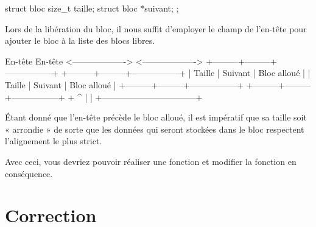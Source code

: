 \begin{C}
struct bloc
{
    size_t taille;
    struct bloc *suivant;
};
\end{C}

Lors de la libération du bloc, il nous suffit d'employer le champ
 de l'en-tête pour ajouter le bloc à la liste des blocs
libres.

\begin{C}
       En-tête                                          En-tête
<------------------->                            <------------------->
+---------+---------+-----------------+          +---------+---------+-----------------+
| Taille  | Suivant |   Bloc alloué   |          | Taille  | Suivant |   Bloc alloué   |
+---------+---------+-----------------+          +---------+---------+-----------------+
               +                                 ^
               |                                 |
               +---------------------------------+
\end{C}

\begin{attentionbox}
  Étant donné que l'en-tête précède le
bloc alloué, il est impératif que sa taille soit « arrondie » de sorte
que les données qui seront stockées dans le bloc respectent l'alignement
le plus strict.
\end{attentionbox}


Avec ceci, vous devriez pouvoir réaliser une fonction
 et modifier la fonction
 en conséquence.


\section{Correction}
\label{correction-22}

